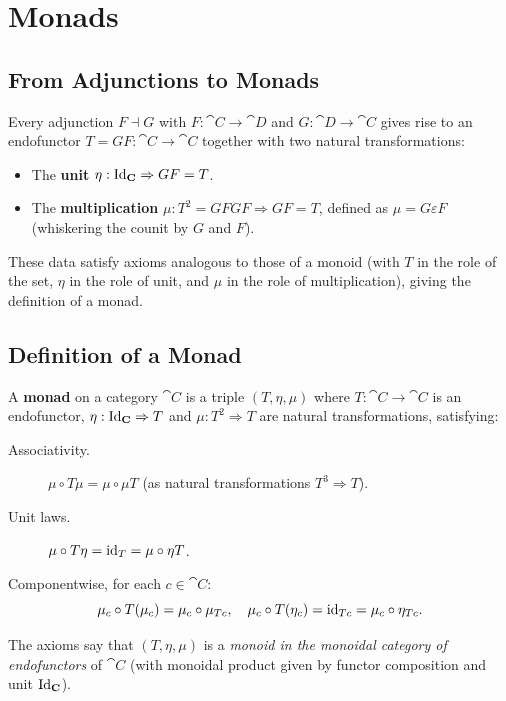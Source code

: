 \chapter{Monads}
\label{ch:monads}

\section{From Adjunctions to Monads}

Every adjunction $F \dashv G$ with $F: \cat{C} \to \cat{D}$ and $G: \cat{D} \to \cat{C}$ gives rise to an endofunctor $T = GF: \cat{C} \to \cat{C}$ together with two natural transformations:
\begin{itemize}
  \item The \textbf{unit} $\eta: \mathrm{Id}_{\mathbf{C}} \Rightarrow GF = T$.
  \item The \textbf{multiplication} $\mu: T^2 = GFGF \Rightarrow GF = T$, defined as $\mu = G\varepsilon F$ (whiskering the counit by $G$ and $F$).
\end{itemize}

These data satisfy axioms analogous to those of a monoid (with $T$ in the role of the set, $\eta$ in the role of unit, and $\mu$ in the role of multiplication), giving the definition of a monad.

\section{Definition of a Monad}

\begin{definition}[Monad]
A \textbf{monad} on a category $\cat{C}$ is a triple $(T, \eta, \mu)$ where $T: \cat{C} \to \cat{C}$ is an endofunctor, $\eta: \mathrm{Id}_{\mathbf{C}} \Rightarrow T$ and $\mu: T^2 \Rightarrow T$ are natural transformations, satisfying:
\begin{description}
  \item[Associativity.] $\mu \circ T\mu = \mu \circ \mu T$ (as natural transformations $T^3 \Rightarrow T$).
  \item[Unit laws.] $\mu \circ T\eta = \mathrm{id}_T = \mu \circ \eta T$.
\end{description}
Componentwise, for each $c \in \cat{C}$:
\[
  \mu_c \circ T(\mu_c) = \mu_c \circ \mu_{Tc}, \quad
  \mu_c \circ T(\eta_c) = \mathrm{id}_{Tc} = \mu_c \circ \eta_{Tc}.
\]
\end{definition}

The axioms say that $(T, \eta, \mu)$ is a \emph{monoid in the monoidal category of endofunctors} of $\cat{C}$ (with monoidal product given by functor composition and unit $\mathrm{Id}_{\mathbf{C}}$).

